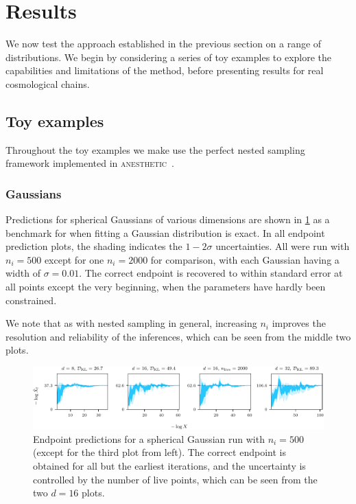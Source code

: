 \documentclass[usenatbib]{mnras}
\newcommand{\nlive}{n_i}
\begin{document}
\section{Results}\label{sec:results}
We now test the approach established in the previous section on a range of distributions. We begin by considering a series of toy examples to explore the capabilities and limitations of the method, before presenting results for real cosmological chains.
\subsection{Toy examples}
Throughout the toy examples we make use the perfect nested sampling~\citep{Keeton_2011,2018BayAn..13..873H} framework implemented in \textsc{anesthetic}~\citep{anesthetic}.
\subsubsection{Gaussians}
Predictions for spherical Gaussians of various dimensions are shown in \cref{fig:gauss_predictions} as a benchmark for when fitting a Gaussian distribution is exact. In all endpoint prediction plots, the shading indicates the $1-2\sigma$ uncertainties. All were run with $\nlive = 500$ except for one $\nlive=2000$ for comparison, with each Gaussian having a width of $\sigma = 0.01$. The correct endpoint is recovered to within standard error at all points except the very beginning, when the parameters have hardly been constrained. 
\par
We note that as with nested sampling in general, increasing $\nlive$ improves the resolution and reliability of the inferences, which can be seen from the middle two plots.
\begin{figure}
\begin{center}
    \includegraphics{figures/gauss_predictions.pdf}
\end{center}
\caption{Endpoint predictions for a spherical Gaussian run with $\nlive=500$ (except for the third plot from left). The correct endpoint is obtained for all but the earliest iterations, and the uncertainty is controlled by the number of live points, which can be seen from the two $d = 16$ plots.}
\label{fig:gauss_predictions}
\end{figure}
\end{document}

